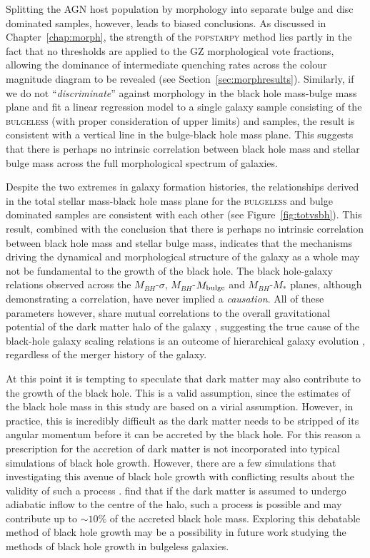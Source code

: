 {Splitting the AGN host population by morphology into separate bulge and disc dominated samples, however, leads to biased conclusions. As discussed in Chapter~\ref{chap:morph}, the strength of the \textsc{popstarpy} method lies partly in the fact that no thresholds are applied to the GZ morphological vote fractions, allowing the dominance of intermediate quenching rates across the colour magnitude diagram to be revealed (see Section~\ref{sec:morphresults}). Similarly, if we do not ``\emph{discriminate}'' against morphology in the black hole mass-bulge mass plane and fit a linear regression model to a single galaxy sample consisting of the \textsc{bulgeless} (with proper consideration of upper limits) and \citet{haringrix04} samples, the result is consistent with a vertical line in the bulge-black hole mass plane. This suggests that there is perhaps no intrinsic correlation between black hole mass and stellar bulge mass across the full morphological spectrum of galaxies. 

Despite the two extremes in galaxy formation histories, the relationships derived in the total stellar mass-black hole mass plane for the \textsc{bulgeless} and bulge dominated \citet{haringrix04} samples are consistent with each other (see Figure~\ref{fig:totvsbh}). This result, combined with the conclusion that there is perhaps no intrinsic correlation between black hole mass and stellar bulge mass, indicates that the mechanisms driving the dynamical and morphological structure of the galaxy as a whole may not be fundamental to the growth of the black hole. The black hole-galaxy relations observed across the $M_{BH}$-$\sigma$, $M_{BH}$-$M_{\rm{bulge}}$ and $M_{BH}$-$M_{*}$ planes, although demonstrating a correlation, have never implied a \emph{causation}. All of these parameters however, share mutual correlations to the overall gravitational potential of the dark matter halo of the galaxy \citep{booth10, volonteri11}, suggesting the true cause of the black-hole galaxy scaling relations is an outcome of hierarchical galaxy evolution \citep{jahnke11}, regardless of the merger history of the galaxy. 

At this point it is tempting to speculate that dark matter may also contribute to the growth of the black hole. This is a valid assumption, since the estimates of the black hole mass in this study are based on a virial assumption. However, in practice, this is incredibly difficult as the dark matter needs to be stripped of its angular momentum before it can be accreted by the black hole. For this reason a prescription for the accretion of dark matter is not incorporated into typical simulations of black hole growth. However, there are a few simulations that investigating this avenue of black hole growth with conflicting results about the validity of such a process \citep{munyaneza06, peirani08, umeda09, hernandez10, guzman11, pepe12, lora14}. \cite{peirani08} find that if the dark matter is assumed to undergo adiabatic inflow to the centre of the halo, such a process is possible and may contribute up to $\sim10\%$ of the accreted black hole mass. Exploring this debatable method of black hole growth may be a possibility in future work studying the methods of black hole growth in bulgeless galaxies. 

}

